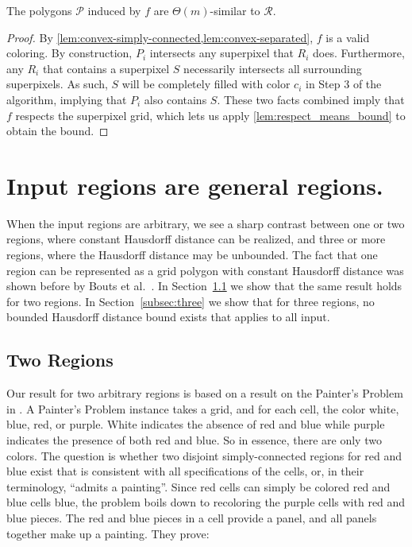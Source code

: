 \documentclass[a4paper,UKenglish,cleveref]{lipics-v2019}
\newcommand{\etal}{\textnormal{et al.}\xspace}
\begin{document}
\begin{theorem}
	The polygons \(\mathcal{P}\) induced by \(f\) are \(\Theta(m)\)-similar to \(\mathcal{R}\).
\end{theorem}
\begin{proof}
	By \cref{lem:convex-simply-connected,lem:convex-separated}, \(f\) is a valid coloring. By construction, \(P_i\) intersects any superpixel that \(R_i\) does. Furthermore, any \(R_i\) that contains a superpixel \(S\) necessarily intersects all surrounding superpixels. As such, \(S\) will be completely filled with color \(c_i\) in Step 3 of the algorithm, implying that \(P_i\) also contains \(S\). These two facts combined imply that \(f\) respects the superpixel grid, which lets us apply \cref{lem:respect_means_bound} to obtain the bound.
\end{proof}

\section{Input regions are general regions.}
\label{sec:general}

When the input regions are arbitrary, we see a sharp contrast between one or two regions, where constant Hausdorff distance can be realized, and three or more regions, where the Hausdorff distance may be unbounded.
The fact that one region can be represented as a grid polygon with constant Hausdorff distance was shown before by Bouts \etal~\cite{bouts2016mapping}. In Section~\ref{subsec:two} we show that the same result holds for two regions. In Section~\ref{subsec:three}
we show that for three regions, no bounded Hausdorff distance bound exists that applies to all input.

\subsection{Two Regions}
\label{subsec:two}

Our result for two arbitrary regions is based on
a result on the Painter's Problem in \cite{goethem2017painter}.
A Painter's Problem instance takes a grid, and for each cell, the color white, blue, red, or purple. White indicates the absence of red and blue while purple indicates the presence of both red and blue. So in
essence, there are only two colors.
The question is whether two disjoint simply-connected regions for red and blue exist that is consistent with all specifications of the
cells, or, in their terminology, ``admits a painting''. Since red cells can simply be colored red and blue cells blue, the problem boils down to recoloring the purple cells with red and blue pieces. The red and blue pieces in a cell provide a panel, and all panels together make up a painting. They prove:
\end{document}
